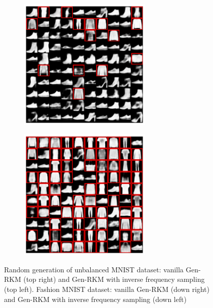 \begin{figure}[H]
\begin{subfigure}{0.45\textwidth}
        \includegraphics[width=0.7\textwidth]{Figures/Methods/FSM_random_generation.png}
    \end{subfigure}
    \hfill
    \begin{subfigure}{0.45\textwidth}
        \centering
        \includegraphics[width=0.7\textwidth]{Figures/Methods/FSM_invw_random_generation.png}
    \end{subfigure}
    \caption{Random generation of unbalanced MNIST dataset: vanilla Gen-RKM (top right) and Gen-RKM with inverse frequency sampling (top left). Fashion MNIST dataset: vanilla Gen-RKM (down right) and Gen-RKM with inverse frequency sampling (down left)}
    \label{fig-ub09}
\end{figure}


